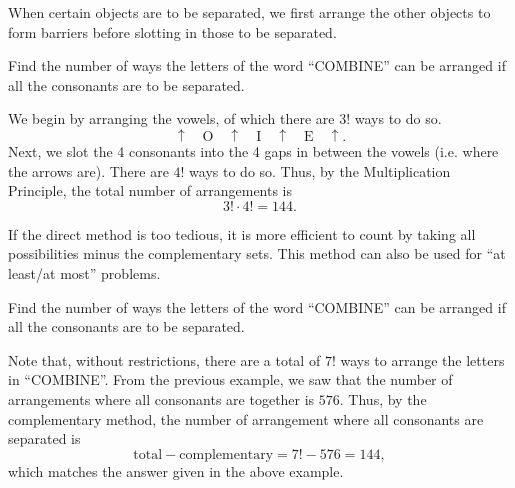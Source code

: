 \begin{recipe}
    When certain objects are to be separated, we first arrange the other objects to form barriers before slotting in those to be separated.
\end{recipe}

\begin{sample}
    Find the number of ways the letters of the word ``COMBINE'' can be arranged if all the consonants are to be separated.
\end{sample}
\begin{sampans}
    We begin by arranging the vowels, of which there are $3!$ ways to do so. \[\uparrow \quad \boxed{\text{O}} \quad \uparrow \quad \boxed{\text{I}} \quad \uparrow \quad \boxed{\text{E}} \quad \uparrow.\] Next, we slot the 4 consonants into the 4 gaps in between the vowels (i.e. where the arrows are). There are $4!$ ways to do so. Thus, by the Multiplication Principle, the total number of arrangements is \[3! \cdot 4! = 144.\]
\end{sampans}

\begin{recipe}
    If the direct method is too tedious, it is more efficient to count by taking all possibilities minus the complementary sets. This method can also be used for ``at least/at most'' problems.
\end{recipe}

\begin{sample}
    Find the number of ways the letters of the word ``COMBINE'' can be arranged if all the consonants are to be separated.
\end{sample}
\begin{sampans}
    Note that, without restrictions, there are a total of $7!$ ways to arrange the letters in ``COMBINE''. From the previous example, we saw that the number of arrangements where all consonants are together is $576$. Thus, by the complementary method, the number of arrangement where all consonants are separated is \[\text{total} - \text{complementary} = 7! - 576 = 144,\] which matches the answer given in the above example.
\end{sampans}